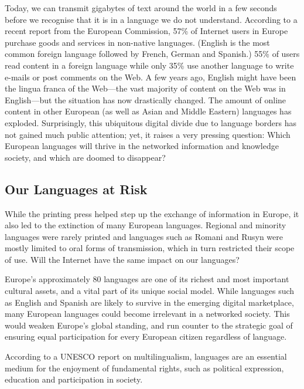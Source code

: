 \begin{multicols}{2}
Today, we can transmit gigabytes of text around the world in a few seconds before we recognise that it is in a language we do not understand. According to a recent report from the European Commission, 57\% of Internet users in Europe purchase goods and services in non-native languages. (English is the most common foreign language followed by French, German and Spanish.) 55\% of users read content in a foreign language while only 35\% use another language to write e-mails or post comments on the Web\cite{EC1}. A few years ago, English might have been the lingua franca of the Web—the vast majority of content on the Web was in English—but the situation has now drastically changed. The amount of online content in other European (as well as Asian and Middle Eastern) languages has exploded.
Surprisingly, this ubiquitous digital divide due to language borders has not gained much public attention; yet, it raises a very pressing question: Which European languages will thrive in the networked information and knowledge society, and which are doomed to disappear?

\subsection{Our Languages at Risk}
While the printing press helped step up the exchange of information in Europe, it also led to the extinction of many European languages. Regional and minority languages were rarely printed and languages such as Romani and Rusyn were mostly limited to oral forms of transmission, which in turn restricted their scope of use. Will the Internet have the same impact on our languages?
 
Europe’s approximately 80 languages are one of its richest and most important cultural assets, and a vital part of its unique social model\cite{EC2}. While languages such as English and Spanish are likely to survive in the emerging digital marketplace, many European languages could become irrelevant in a networked society. This would weaken Europe’s global standing, and run counter to the strategic goal of ensuring equal participation for every European citizen regardless of language. 

According to a UNESCO report on multilingualism, languages are an essential medium for the enjoyment of fundamental rights, such as political expression, education and participation in society\cite{Unesco1}.

\end{multicols}
